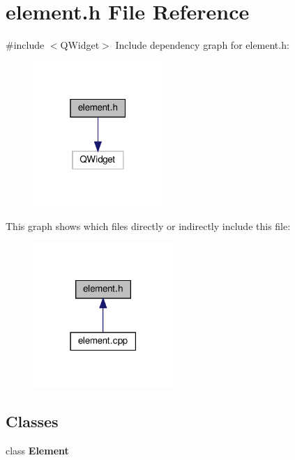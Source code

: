 \section{element.\+h File Reference}
\label{element_8h}
{\ttfamily \#include $<$Q\+Widget$>$}\newline
Include dependency graph for element.\+h\+:
\nopagebreak
\begin{figure}[H]
\begin{center}
\leavevmode
\includegraphics[width=139pt]{element_8h__incl}
\end{center}
\end{figure}
This graph shows which files directly or indirectly include this file\+:
\nopagebreak
\begin{figure}[H]
\begin{center}
\leavevmode
\includegraphics[width=150pt]{element_8h__dep__incl}
\end{center}
\end{figure}
\subsection*{Classes}
\begin{DoxyCompactItemize}
\item 
class \textbf{ Element}
\end{DoxyCompactItemize}
